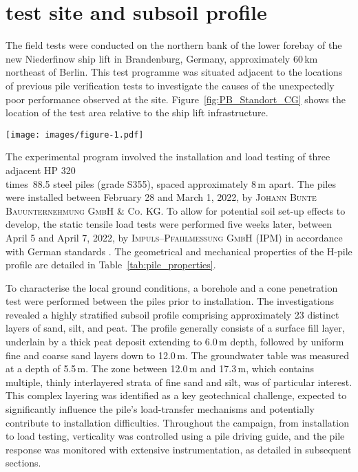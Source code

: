 \section{test site and subsoil profile}\label{sec:New_field_test}
The field tests were conducted on the northern bank of the lower forebay of the new Niederfinow ship lift in Brandenburg, Germany, approximately 60\,km northeast of Berlin. This test programme was situated adjacent to the locations of previous pile verification tests to investigate the causes of the unexpectedly poor performance observed at the site. Figure~\ref{fig:PB_Standort_CG} shows the location of the test area relative to the ship lift infrastructure.
\begin{figure*}[!h]
	\centering
	\texttt{[image: images/figure-1.pdf]}
	\caption{Site plan of the Niederfinow ship lift showing test pile locations: aerial view (left) and map view (right). Blue dots indicate the locations of previous pile load tests (sites 1-3), while the red dot marks the location of the new field tests.}
	\label{fig:PB_Standort_CG}
\end{figure*}

The experimental program involved the installation and load testing of three adjacent HP 320~\\times~88.5 steel piles (grade S355), spaced approximately 8\,m apart. The piles were installed between February 28 and March 1, 2022, by \textsc{Johann Bunte Bauunternehmung GmbH \& Co. KG}. To allow for potential soil set-up effects to develop, the static tensile load tests were performed five weeks later, between April 5 and April 7, 2022, by \textsc{Impuls--Pfahlmessung GmbH (IPM)} in accordance with German standards \parencite{din1054, EAP.2012}. The geometrical and mechanical properties of the H-pile profile are detailed in Table~\ref{tab:pile_properties}. 


To characterise the local ground conditions, a borehole and a cone penetration test were performed between the piles prior to installation. The investigations revealed a highly stratified subsoil profile comprising approximately 23 distinct layers of sand, silt, and peat. The profile generally consists of a surface fill layer, underlain by a thick peat deposit extending to 6.0\,m depth, followed by uniform fine and coarse sand layers down to 12.0\,m. The groundwater table was measured at a depth of 5.5\,m. The zone between 12.0\,m and 17.3\,m, which contains multiple, thinly interlayered strata of fine sand and silt, was of particular interest. This complex layering was identified as a key geotechnical challenge, expected to significantly influence the pile's load-transfer mechanisms and potentially contribute to installation difficulties. Throughout the campaign, from installation to load testing, verticality was controlled using a pile driving guide, and the pile response was monitored with extensive instrumentation, as detailed in subsequent sections.

